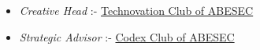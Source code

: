 \vspace{6pt}

\begin{itemize}
\item\textit{Creative Head} :- \underline{Technovation Club of ABESEC}
\item\textit{Strategic Advisor} :- \underline{Codex Club of ABESEC}
\end{itemize}
